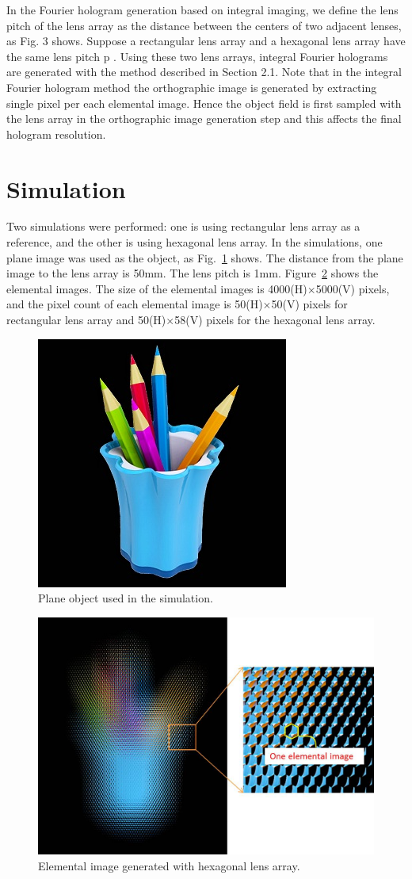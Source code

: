 \documentclass[10pt,letterpaper]{article}
\begin{document}
In the Fourier hologram generation based on integral imaging, we define the lens pitch of the lens array as the distance between the centers of two adjacent lenses, as Fig. 3 shows. Suppose a rectangular lens array and a hexagonal lens array have the same lens pitch p . Using these two lens arrays, integral Fourier holograms are generated with the method described in Section 2.1. Note that in the integral Fourier hologram method the orthographic image is generated by extracting single pixel per each elemental image. Hence the object field is first sampled with the lens array in the orthographic image generation step and this affects the final hologram resolution. 

\section{Simulation}
Two simulations were performed: one is using rectangular lens array as a reference, and the other is using hexagonal lens array. In the simulations, one plane image was used as the object, as Fig.~\ref{fig_7} shows. The distance from the plane image to the lens array is 50mm. The lens pitch is 1mm. Figure~\ref{fig_8} shows the elemental images. The size of the elemental images is 4000(H)$\times$5000(V) pixels, and the pixel count of each elemental image is 50(H)$\times$50(V) pixels  for  rectangular lens array and 50(H)$\times$58(V) pixels for the hexagonal lens array.
\begin{figure}[htb]
\centering\includegraphics[width=.2\columnwidth]{fig_7}
\caption{Plane object used in the simulation.}
\label{fig_7}
\end{figure}
\begin{figure}[htb]
\centering\includegraphics[width=.5\columnwidth]{fig_8}
\caption{Elemental image generated with hexagonal lens array.}
\label{fig_8}
\end{figure}
\end{document}
